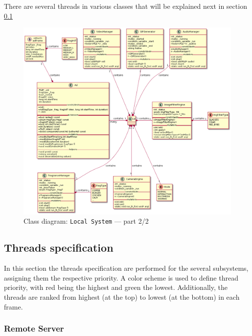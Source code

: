There are several threads in various classes that will be explained next in section \ref{sec:thre-spec}  
%
\begin{figure}[htb!]
\centering
    \includegraphics[width=1.0\columnwidth]{./img/class-diag-local-2.png}
  \caption{Class diagram: \texttt{Local System} --- part 2/2}%
\label{fig:class-diag-local-2}
\end{figure}

\subsection{Threads specification}
\label{sec:thre-spec}
In this section the threads specification are performed for the several
subsystems, assigning them the respective priority. A color scheme is used to
define thread priority, with red being the highest and green the
lowest. Additionally, the threads are ranked from highest (at the top) to lowest
(at the bottom) in each frame.

\subsubsection{Remote Server}
\label{sec:remote-server-threads}

